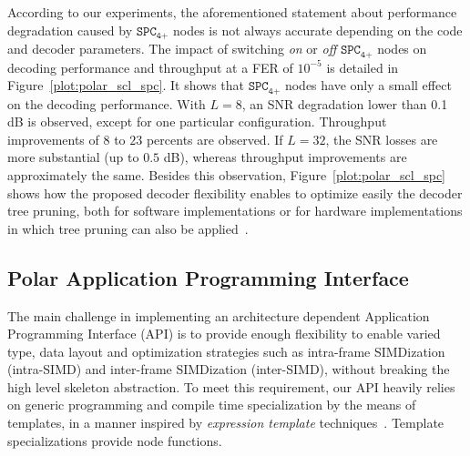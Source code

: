 According to our experiments, the aforementioned statement about performance
degradation caused by $\texttt{SPC}_\texttt{4+}$ nodes is not always accurate
depending on the code and decoder parameters. The impact of switching
\textit{on} or \textit{off} $\texttt{SPC}_\texttt{4+}$ nodes on decoding
performance and throughput at a FER of $10^{-5}$ is detailed in
Figure~\ref{plot:polar_scl_spc}. It shows that $\texttt{SPC}_\texttt{4+}$ nodes
have only a small effect on the decoding performance. With $L=8$, an SNR
degradation lower than 0.1 dB is observed, except for one particular
configuration. Throughput improvements of $8$ to $23$ percents are observed. If
$L=32$, the SNR losses are more substantial (up to $0.5$ dB), whereas throughput
improvements are approximately the same. Besides this observation,
Figure~\ref{plot:polar_scl_spc} shows how the proposed decoder flexibility
enables to optimize easily the decoder tree pruning, both for software
implementations or for hardware implementations in which tree pruning can also
be applied~\cite{Lin2014}.

\subsection{Polar Application Programming Interface}
\label{sec:opt_polar_api}


The main challenge in implementing an architecture dependent Application
Programming Interface (API) is to provide enough flexibility to enable varied
type, data layout and optimization strategies such as intra-frame SIMDization
(intra-SIMD) and inter-frame SIMDization (inter-SIMD), without breaking the high
level skeleton abstraction. To meet this requirement, our API heavily relies on
generic programming and compile time specialization by the means of \Cxx
templates, in a manner inspired by \emph{expression template}
techniques~\cite{Stroustrup2013}. Template specializations provide node
functions.

